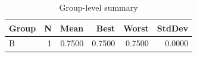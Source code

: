 \begin{table}[htbp]
\centering
\caption{Group-level summary}
\label{tab:group-summary}
\begin{tabular}{lrrrrr}
\toprule
\textbf{Group} & \textbf{N} & \textbf{Mean} & \textbf{Best} & \textbf{Worst} & \textbf{StdDev} \\
\midrule
B & 1 & 0.7500 & 0.7500 & 0.7500 & 0.0000 \\
\bottomrule
\end{tabular}
\end{table}